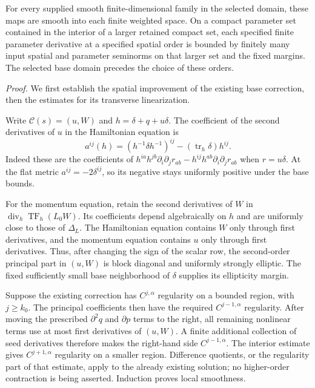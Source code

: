 \documentclass[
  english,
  11pt,
  reqno]{amsart}
\begin{document}
For every supplied smooth finite-dimensional family in the selected
domain, these maps are smooth into each finite weighted space. On a
compact parameter set contained in the interior of a larger retained
compact set, each specified finite parameter derivative at a specified
spatial order is bounded by finitely many input spatial and parameter
seminorms on that larger set and the fixed margins. The selected base
domain precedes the choice of these orders.

\emph{Proof.} We first establish the spatial improvement of the existing
base correction, then the estimates for its transverse linearization.

Write \(\mathcal C(s)=(u,W)\) and \(h=\delta+q+u\delta\). The
coefficient of the second derivatives of \(u\) in the Hamiltonian
equation is%
 \[
a^{ij}(h)
=(h^{-1}\delta h^{-1})^{ij}
-(\operatorname{tr}_h\delta)h^{ij}.
\] Indeed these are the coefficients of
\(h^{ia}h^{jb}\partial_i\partial_j r_{ab}
-h^{ij}h^{ab}\partial_i\partial_jr_{ab}\) when \(r=u\delta\). At the
flat metric \(a^{ij}=-2\delta^{ij}\), so its negative stays uniformly
positive under the base bounds.

For the momentum equation, retain the second derivatives of \(W\) in
\(\operatorname{div}_h\operatorname{TF}_h(L_0W)\). Its coefficients
depend algebraically on \(h\) and are uniformly close to those of
\(\Delta_L\). The Hamiltonian equation contains \(W\) only through first
derivatives, and the momentum equation contains \(u\) only through first
derivatives. Thus, after changing the sign of the scalar row, the
second-order principal part in \((u,W)\) is block diagonal and uniformly
strongly elliptic. The fixed sufficiently small base neighborhood of
\(\delta\) supplies its ellipticity margin.

Suppose the existing correction has \(C^{j,\alpha}\) regularity on a
bounded region, with \(j\ge k_0\). The principal coefficients then have
the required \(C^{j-1,\alpha}\) regularity. After moving the prescribed
\(\partial^2q\) and \(\partial p\) terms to the right, all remaining
nonlinear terms use at most first derivatives of \((u,W)\). A finite
additional collection of seed derivatives therefore makes the right-hand
side \(C^{j-1,\alpha}\). The interior estimate gives \(C^{j+1,\alpha}\)
regularity on a smaller region. Difference quotients, or the regularity
part of that estimate, apply to the already existing solution; no
higher-order contraction is being asserted. Induction proves local
smoothness.
\end{document}
